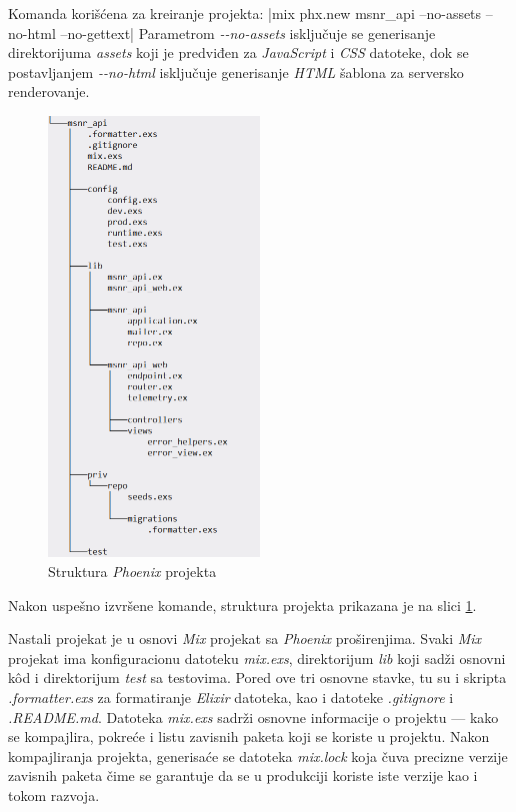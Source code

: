 \documentclass[12pt,oneside]{memoir}
\begin{document}
Komanda korišćena za kreiranje projekta:
|mix phx.new msnr_api --no-assets --no-html --no-gettext|
\noindent Parametrom \emph{-{}-no-assets} isključuje se generisanje direktorijuma \emph{assets} koji je predviđen za \emph{JavaScript} i \emph{CSS} datoteke,
dok se postavljanjem \emph{-{}-no-html} isključuje generisanje \emph{HTML} šablona za serversko renderovanje.
\begin{figure}[!h]
  \centering
  \includegraphics[width=0.5\textwidth]{msnr-dir.png}
  \caption{Struktura \emph{Phoenix} projekta}
  \label{fig:msnr-dir}
\end{figure}
Nakon uspešno izvršene komande, struktura projekta prikazana je na slici \ref{fig:msnr-dir}.

Nastali projekat je u osnovi \emph{Mix} projekat sa \emph{Phoenix} proširenjima. Svaki \emph{Mix} projekat ima
konfiguracionu datoteku \emph{mix.exs}, direktorijum \emph{lib} koji sadži osnovni k\^{o}d i direktorijum \emph{test} sa testovima.
Pored ove tri osnovne stavke, tu su i skripta \emph{.formatter.exs} za formatiranje \emph{Elixir} datoteka, kao i datoteke \emph{.gitignore} i
\emph{.README.md}. Datoteka \emph{mix.exs} sadrži osnovne informacije o projektu --- kako se kompajlira, pokreće i 
listu zavisnih paketa koji se koriste u projektu. Nakon kompajliranja projekta, generisaće se datoteka \emph{mix.lock} koja
čuva precizne verzije zavisnih paketa čime se garantuje da se u produkciji koriste iste verzije kao i tokom razvoja.
\end{document}
